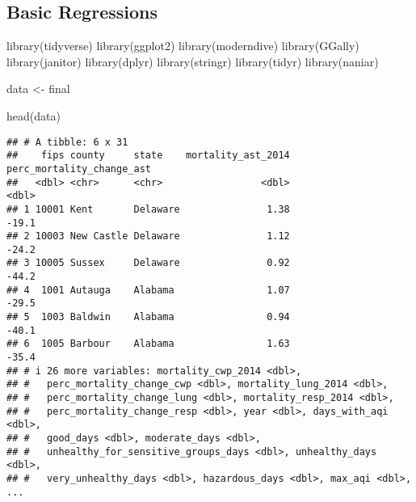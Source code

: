 \documentclass[
]{article}
\newenvironment{Shaded}{\begin{snugshade}}{\end{snugshade}}
\newcommand{\FunctionTok}[1]{\textcolor[rgb]{0.00,0.00,0.00}{#1}}
\newcommand{\NormalTok}[1]{#1}
\newcommand{\OtherTok}[1]{\textcolor[rgb]{0.56,0.35,0.01}{#1}}
\begin{document}
\hypertarget{basic-regressions}{%
\subsection{Basic Regressions}\label{basic-regressions}}

\begin{Shaded}
\begin{Highlighting}[]
\FunctionTok{library}\NormalTok{(tidyverse)}
\FunctionTok{library}\NormalTok{(ggplot2)}
\FunctionTok{library}\NormalTok{(moderndive)}
\FunctionTok{library}\NormalTok{(GGally)}
\FunctionTok{library}\NormalTok{(janitor)}
\FunctionTok{library}\NormalTok{(dplyr)}
\FunctionTok{library}\NormalTok{(stringr)}
\FunctionTok{library}\NormalTok{(tidyr)}
\FunctionTok{library}\NormalTok{(naniar)}
\end{Highlighting}
\end{Shaded}

\begin{Shaded}
\begin{Highlighting}[]
\NormalTok{data }\OtherTok{\textless{}{-}}\NormalTok{ final}
\end{Highlighting}
\end{Shaded}

\begin{Shaded}
\begin{Highlighting}[]
\FunctionTok{head}\NormalTok{(data)}
\end{Highlighting}
\end{Shaded}

\begin{verbatim}
## # A tibble: 6 x 31
##    fips county     state    mortality_ast_2014 perc_mortality_change_ast
##   <dbl> <chr>      <chr>                 <dbl>                     <dbl>
## 1 10001 Kent       Delaware               1.38                     -19.1
## 2 10003 New Castle Delaware               1.12                     -24.2
## 3 10005 Sussex     Delaware               0.92                     -44.2
## 4  1001 Autauga    Alabama                1.07                     -29.5
## 5  1003 Baldwin    Alabama                0.94                     -40.1
## 6  1005 Barbour    Alabama                1.63                     -35.4
## # i 26 more variables: mortality_cwp_2014 <dbl>,
## #   perc_mortality_change_cwp <dbl>, mortality_lung_2014 <dbl>,
## #   perc_mortality_change_lung <dbl>, mortality_resp_2014 <dbl>,
## #   perc_mortality_change_resp <dbl>, year <dbl>, days_with_aqi <dbl>,
## #   good_days <dbl>, moderate_days <dbl>,
## #   unhealthy_for_sensitive_groups_days <dbl>, unhealthy_days <dbl>,
## #   very_unhealthy_days <dbl>, hazardous_days <dbl>, max_aqi <dbl>, ...
\end{verbatim}
\end{document}
